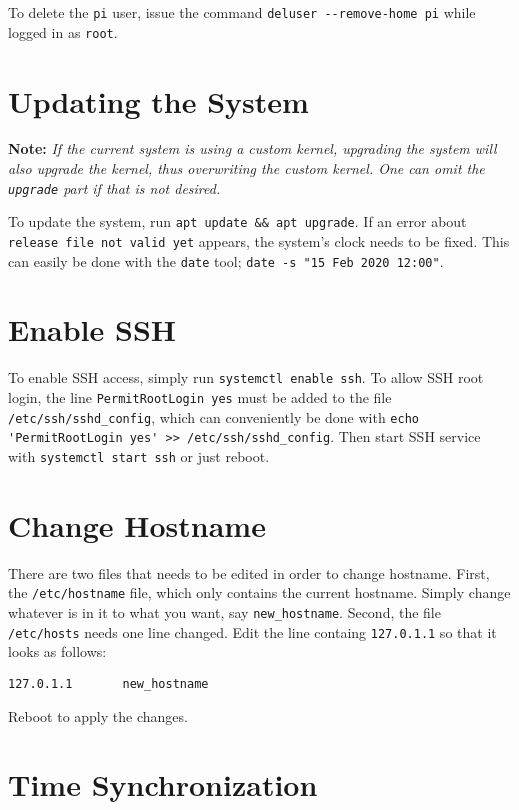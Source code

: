 To delete the \lstinline{pi} user, issue the command \lstinline{deluser --remove-home pi} while logged in as \lstinline{root}.


\section{Updating the System} \label{update_system}

\textbf{Note:} \textit{If the current system is using a custom kernel, upgrading the system will also upgrade the kernel, thus overwriting the custom kernel. One can omit the \lstinline{upgrade} part if that is not desired.}

To update the system, run \lstinline{apt update && apt upgrade}. If an error about \lstinline{release file not valid yet} appears, the system's clock needs to be fixed. This can easily be done with the \lstinline{date} tool; \lstinline{date -s "15 Feb 2020 12:00"}.


\section{Enable SSH} \label{enable_ssh}

To enable SSH access, simply run \lstinline{systemctl enable ssh}. To allow SSH root login, the line \lstinline{PermitRootLogin yes} must be added to the file \lstinline{/etc/ssh/sshd_config}, which can conveniently be done with \lstinline{echo 'PermitRootLogin yes' >> /etc/ssh/sshd_config}. Then start SSH service with \lstinline{systemctl start ssh} or just reboot.


\section{Change Hostname} \label{change_hostname}

There are two files that needs to be edited in order to change hostname. First, the \lstinline{/etc/hostname} file, which only contains the current hostname. Simply change whatever is in it to what you want, say \lstinline{new_hostname}. Second, the file \lstinline{/etc/hosts} needs one line changed. Edit the line containg \lstinline{127.0.1.1} so that it looks as follows:

\begin{verbatim}
127.0.1.1       new_hostname
\end{verbatim}

Reboot to apply the changes.


\section{Time Synchronization} \label{time_sync}

